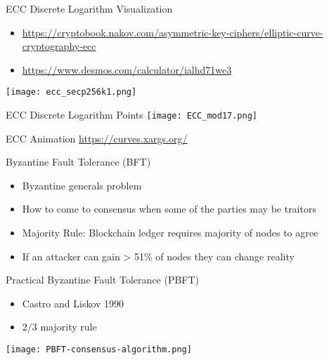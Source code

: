 \begin{withoutheadline}
\begin{frame}{ECC Discrete Logarithm Visualization}
    \begin{itemize}
        \item \url{https://cryptobook.nakov.com/asymmetric-key-ciphers/elliptic-curve-cryptography-ecc}
        \item \url{https://www.desmos.com/calculator/ialhd71we3}
    \end{itemize}
    \texttt{[image: ecc\_secp256k1.png]}
\end{frame}

\begin{frame}{ECC Discrete Logarithm Points}
    \texttt{[image: ECC\_mod17.png]}
\end{frame}


\begin{frame}{ECC Animation}
    \url{https://curves.xargs.org/}
\end{frame}
    
\begin{frame}{Byzantine Fault Tolerance (BFT)}
    \begin{itemize}
        \item Byzantine generals problem
        \item How to come to consensus when some of the parties may be traitors
        \item Majority Rule: Blockchain ledger requires majority of nodes to agree
        \item If an attacker can gain > 51\% of nodes they can change reality
    \end{itemize}
\end{frame}

\begin{frame}{Practical Byzantine Fault Tolerance (PBFT)}
    \begin{itemize}
        \item Castro and Liskov 1990 %
        \item $2/3$ majority rule
    \end{itemize}
    \texttt{[image: PBFT-consensus-algorithm.png]}
\end{frame}


\end{withoutheadline}
